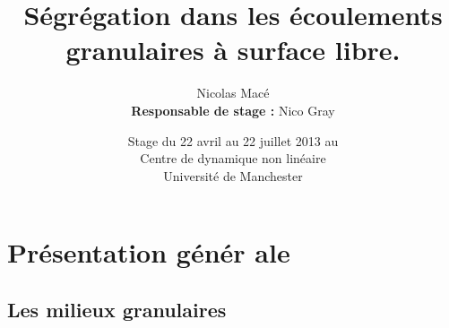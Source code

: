 \documentclass[xcolor=dvipsnames]{beamer}
\title[Ségrégation dans les écoulements granulaires.]{Ségrégation  dans les écoulements granulaires à surface libre.}
\date{Stage du 22 avril au 22 juillet 2013 au \\ 
\huge{Centre de dynamique non linéaire} \\ 
\small{Université de Manchester}}
\author{Nicolas Macé\\ 
\textbf{Responsable de stage :} Nico Gray}
\begin{document}
\begin{frame}
\begin{titlepage}
\end{titlepage}
\end{frame}


\section{Présentation génér	ale}
\subsection{Les milieux granulaires}
\begin{frame}

\begin{columns}[t]

  \begin{column}{5cm}
\begin{figure}[htp]
\centering

\end{figure}
\end{column}
\end{columns}
\end{frame}
\end{document}
